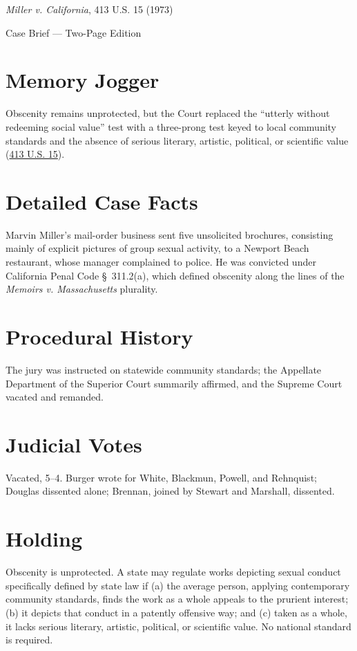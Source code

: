 \documentclass[12pt]{article}
\begin{document}
\begin{center}
{\LARGE \textit{Miller v. California}, 413 U.S. 15 (1973)\par}
\vspace{0.5em}
{\large Case Brief --- Two-Page Edition\par}
\end{center}

\section{Memory Jogger}
Obscenity remains unprotected, but the Court replaced the ``utterly without redeeming social value'' test with a three-prong test keyed to local community standards and the absence of serious literary, artistic, political, or scientific value (\href{https://supreme.justia.com/cases/federal/us/413/15/}{413 U.S. 15}).

\section{Detailed Case Facts}
Marvin Miller's mail-order business sent five unsolicited brochures, consisting mainly of explicit pictures of group sexual activity, to a Newport Beach restaurant, whose manager complained to police. He was convicted under California Penal Code \S~311.2(a), which defined obscenity along the lines of the \textit{Memoirs v. Massachusetts} plurality.

\section{Procedural History}
The jury was instructed on statewide community standards; the Appellate Department of the Superior Court summarily affirmed, and the Supreme Court vacated and remanded.

\section{Judicial Votes}
Vacated, 5--4. Burger wrote for White, Blackmun, Powell, and Rehnquist; Douglas dissented alone; Brennan, joined by Stewart and Marshall, dissented.

\section{Holding}
Obscenity is unprotected. A state may regulate works depicting sexual conduct specifically defined by state law if (a) the average person, applying contemporary community standards, finds the work as a whole appeals to the prurient interest; (b) it depicts that conduct in a patently offensive way; and (c) taken as a whole, it lacks serious literary, artistic, political, or scientific value. No national standard is required.
\end{document}
